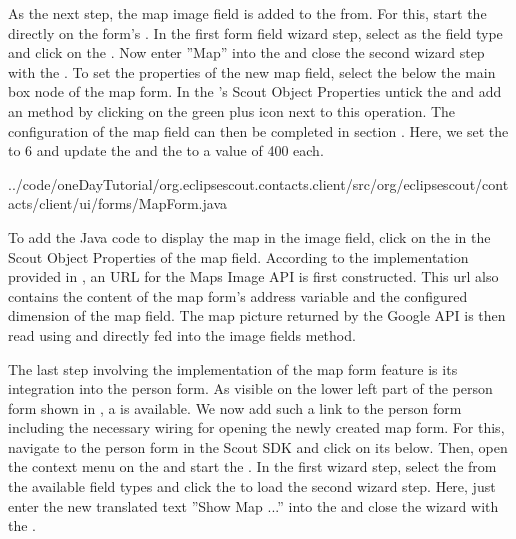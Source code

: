 \documentclass[a4paper,10pt,twoside]{book}
\begin{document}
As the next step, the map image field is added to the from. 
For this, start the  directly on the form's . 
In the first form field wizard step, select  as the field type and click on the . 
Now enter ''Map'' into the  and close the second wizard step with the .
To set the properties of the new map field, select the  below the main box node of the map form. 
In the 's Scout Object Properties untick the  and add an  method by clicking on the green plus icon next to this operation. 
The configuration of the map field can then be completed in section . 
Here, we set the  to 6 and update the  and the  to a value of 400 each.


{../code/oneDayTutorial/org.eclipsescout.contacts.client/src/org/eclipsescout/contacts/client/ui/forms/MapForm.java}

To add the Java code to display the map in the image field, click on the  in the Scout Object Properties of the map field. 
According to the implementation provided in , an URL for the Maps Image API is first constructed. 
This url also contains the content of the map form's address variable and the configured dimension of the map field. 
The map picture returned by the Google API is then read using  and directly fed into the image fields  method. 

The last step involving the implementation of the map form feature is its integration into the person form. 
As visible on the lower left part of the person form shown in , a  is available. 
We now add such a link to the person form including the necessary wiring for opening the newly created map form. 
For this, navigate to the person form in the Scout SDK and click on its  below. 
Then, open the context menu on the  and start the . 
In the first wizard step, select the  from the available field types and click the  to load the second wizard step. 
Here, just enter the new translated text ''Show Map ...'' into the  and close the wizard with the . 
\end{document}

